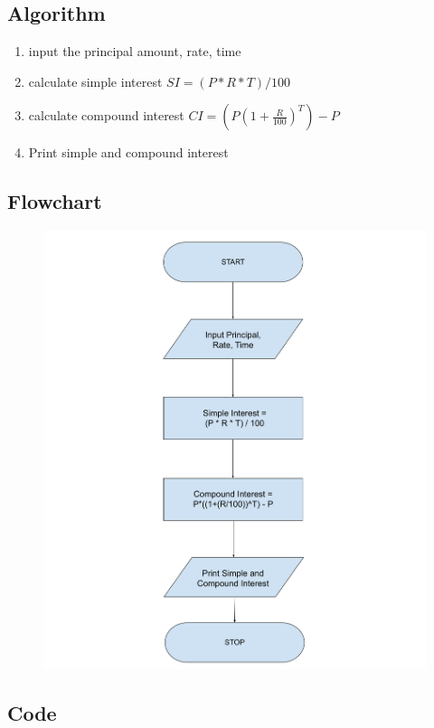 \documentclass[12pt]{article}
\begin{document}
\section{}
\subsection{Algorithm}
\begin{enumerate}
    \item input the principal amount, rate, time
    \item calculate simple interest $SI=(P*R*T)/100$
    \item calculate compound interest $CI=(P(1+\frac{R}{100})^T)-P$
    \item Print simple and compound interest
\end{enumerate}
\subsection{Flowchart}
\begin{figure}[h]
    \centering
    \includegraphics[width=1.0\textwidth]{Flowchart06.png}
\end{figure}
\newpage
\subsection{Code}
\inputminted{c}{q6.c}
\end{document}
